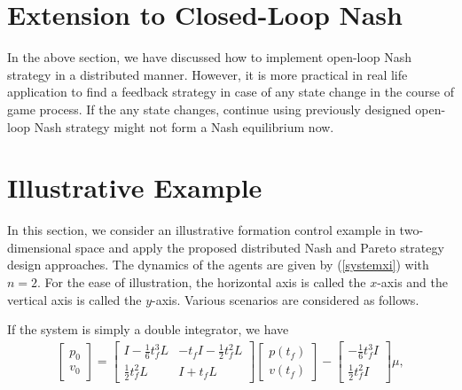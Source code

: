 \documentclass[10pt,doublecolumn]{IEEEtran}  %
\begin{document}
\section{Extension to Closed-Loop Nash}
In the above section, we have discussed how to implement open-loop Nash strategy in a distributed manner. However, it is more practical in real life application to find a feedback strategy in case of any state change in the course of game process. If the any state changes, continue using previously designed open-loop Nash strategy might not form a Nash equilibrium now.

\section{Illustrative Example}\label{simulation}
In this section, we consider an illustrative formation control example in two-dimensional space and apply the proposed distributed Nash and Pareto strategy design approaches. The dynamics of the agents are given by (\ref{systemxi}) with $n=2$. For the ease of illustration, the horizontal axis is called the $x$-axis and the vertical axis is called the $y$-axis. Various scenarios are considered as follows.







\begin{Rmk}
If the system is simply a double integrator, we have 
\begin{align*}
\begin{bmatrix}
p_0\\
v_0
\end{bmatrix}=\begin{bmatrix}
I-\frac{1}{6}t_f^3L&-t_fI-\frac{1}{2}t_f^2L\\
\frac{1}{2}t_f^2L&I+t_fL
\end{bmatrix}
\begin{bmatrix}
p(t_f)\\
v(t_f)
\end{bmatrix}-\begin{bmatrix}
-\frac{1}{6}t_f^3I\\ \frac{1}{2}t_f^2I
\end{bmatrix}\mu,
\end{align*}
\end{Rmk}
\end{document}
